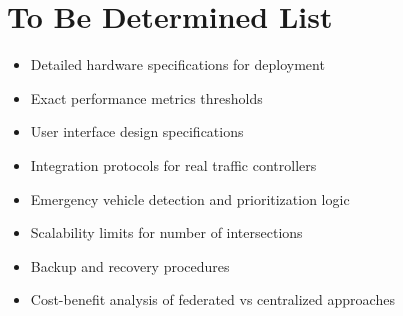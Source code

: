 \section{To Be Determined List}

\begin{itemize}
\item Detailed hardware specifications for deployment
\item Exact performance metrics thresholds
\item User interface design specifications
\item Integration protocols for real traffic controllers
\item Emergency vehicle detection and prioritization logic
\item Scalability limits for number of intersections
\item Backup and recovery procedures
\item Cost-benefit analysis of federated vs centralized approaches
\end{itemize}